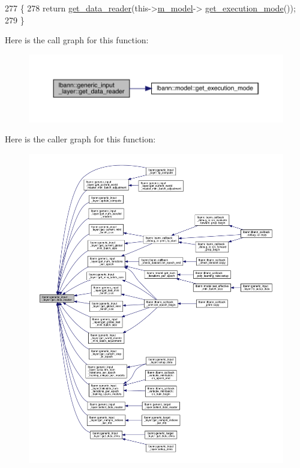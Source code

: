 \begin{DoxyCode}
277                                                \{
278     \textcolor{keywordflow}{return} \hyperlink{classlbann_1_1generic__input__layer_aba732becdb02627e3ad4493ac19e8fb6}{get\_data\_reader}(this->\hyperlink{classlbann_1_1Layer_a3d9315e99574166f2f33e37b572021d2}{m\_model}->
      \hyperlink{classlbann_1_1model_addb40597cf29aa6d31b6a7d09ef48608}{get\_execution\_mode}());
279   \}
\end{DoxyCode}
Here is the call graph for this function\+:\nopagebreak
\begin{figure}[H]
\begin{center}
\leavevmode
\includegraphics[width=350pt]{classlbann_1_1generic__input__layer_aba732becdb02627e3ad4493ac19e8fb6_cgraph}
\end{center}
\end{figure}
Here is the caller graph for this function\+:\nopagebreak
\begin{figure}[H]
\begin{center}
\leavevmode
\includegraphics[width=350pt]{classlbann_1_1generic__input__layer_aba732becdb02627e3ad4493ac19e8fb6_icgraph}
\end{center}
\end{figure}

